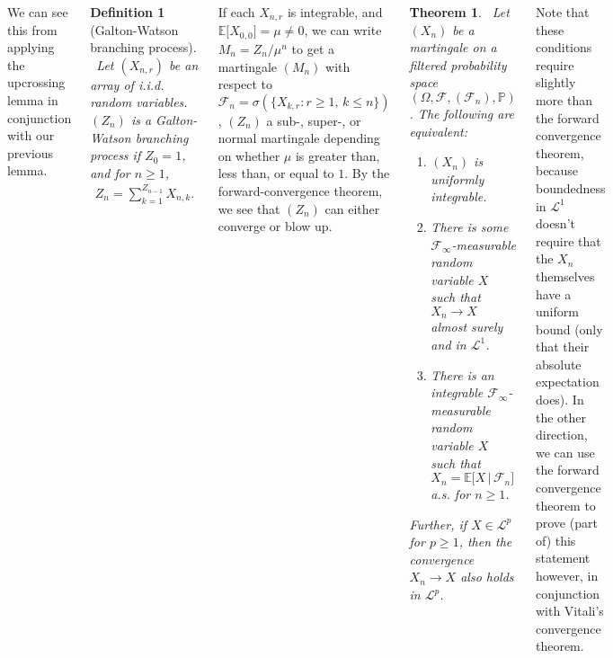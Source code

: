 \documentclass{tikzposter} %
\newtheorem{theorem}{Theorem}
\newtheorem{definition}{Definition}
\begin{document}
\begin{columns}
{    We can see this from applying the upcrossing lemma in conjunction with our previous lemma. \\

    \begin{definition}[Galton-Watson branching process]
    \ Let $(X_{n,r})$ be an array of i.i.d. random variables. $(Z_{n})$ is a Galton-Watson branching process if $Z_{0} = 1$, and for $n \ge 1$,
    \begin{align*}
      Z_{n} = \sum_{k=1}^{Z_{n-1}} X_{n,k}.
    \end{align*}
    \end{definition}
    \hphantom{}

    If each $X_{n,r}$ is integrable, and $\mathbb{E}\big[X_{0,0}\big] = \mu \neq 0$, we can write $M_{n} = Z_{n}/\mu^{n}$ to get a martingale $(M_{n})$ with respect to $\mathcal{F}_{n} = \sigma(\{X_{k,r} : r \ge 1,\, k \le n\})$, $(Z_{n})$ a sub-, super-, or normal martingale depending on whether $\mu$ is greater than, less than, or equal to $1$. By the forward-convergence theorem, we see that $(Z_{n})$ can either converge or blow up. \\

    \begin{theorem}
    \ Let $(X_{n})$ be a martingale on a filtered probability space $(\Omega, \mathcal{F}, (\mathcal{F}_{n}), \mathbb{P})$. The following are equivalent:
    \begin{enumerate}[label=\roman*.]
            \item $(X_{n})$ is uniformly integrable.
            \item There is some $\mathcal{F}_{\infty}$-measurable random variable $X$ such that $X_{n} \to X$ almost surely and in $\mathcal{L}^{1}$.
            \item There is an integrable $\mathcal{F}_{\infty}$-measurable random variable $X$ such that $X_{n} = \mathbb{E}\big[X \,|\, \mathcal{F}_{n}\big]$ a.s. for $n \ge 1$.
    \end{enumerate}
    Further, if $X \in \mathcal{L}^{p}$ for $p \ge 1$, then the convergence $X_{n} \to X$ also holds in $\mathcal{L}^{p}$.
    \end{theorem}
    \hphantom{}

    Note that these conditions require slightly more than the forward convergence theorem, because boundedness in $\mathcal{L}^{1}$ doesn't require that the $X_{n}$ themselves have a uniform bound (only that their absolute expectation does). In the other direction, we can use the forward convergence theorem to prove (part of) this statement however, in conjunction with Vitali's convergence theorem. \\

}
\end{columns}
\end{document}
